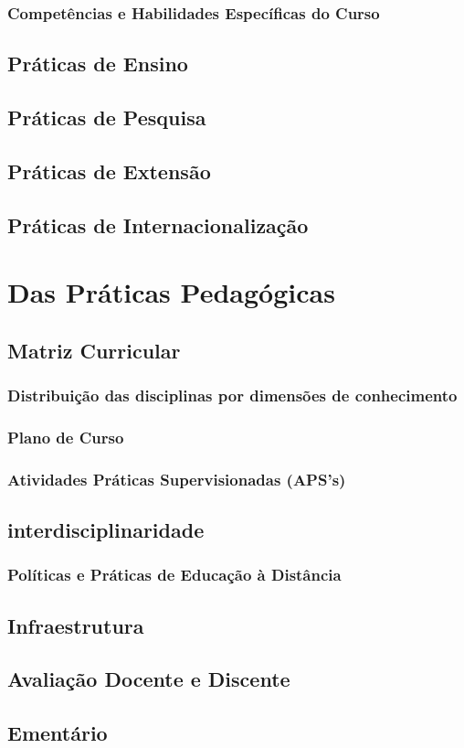 \documentclass[a4paper, 12pt, openright, oneside, german, french, english, brazil]{abntex2}
\begin{document}
\section{Competências e Habilidades Específicas do Curso}


\chapter{Práticas de Ensino}

\chapter{Práticas de Pesquisa}

\chapter{Práticas de Extensão}

\chapter{Práticas de Internacionalização}



\part{Das Práticas Pedagógicas}

\chapter{Matriz Curricular}


\section{Distribuição das disciplinas por dimensões de conhecimento}


\section{Plano de Curso}

\section{Atividades Práticas Supervisionadas (APS's)}



\chapter{interdisciplinaridade}

\section{Políticas e Práticas de Educação à Distância}


\chapter{Infraestrutura}


\chapter{Avaliação Docente e Discente}


\chapter{Ementário}
\end{document}
